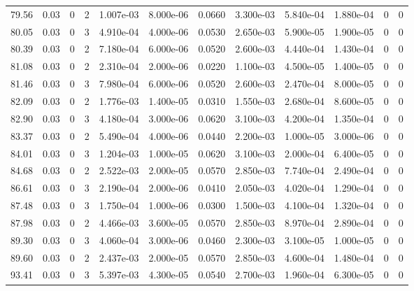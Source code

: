 \documentclass[preview]{standalone}
\begin{document}
{{{{\begin{tabular}{L{1.2cm}C{1.2cm} C{0.3cm}C{0.5cm} C{1.4cm}C{1.4cm} C{1.4cm}C{1.4cm} C{1.6cm}C{1.6cm} C{1.6cm}C{1.6cm}}
  79.56  &  0.03  & 0     &  2 &  1.007e-03  & 8.000e-06  &  0.0660&   3.300e-03& 5.840e-04 & 1.880e-04   &  0 & 0  \\ 
  80.05  &  0.03  & 0     &  3 &  4.910e-04  & 4.000e-06  &  0.0530&   2.650e-03& 5.900e-05 & 1.900e-05   &  0 & 0  \\ 
  80.39  &  0.03  & 0     &  2 &  7.180e-04  & 6.000e-06  &  0.0520&   2.600e-03& 4.440e-04 & 1.430e-04   &  0 & 0  \\ 
  81.08  &  0.03  & 0     &  2 &  2.310e-04  & 2.000e-06  &  0.0220&   1.100e-03& 4.500e-05 & 1.400e-05   &  0 & 0  \\ 
  81.46  &  0.03  & 0     &  3 &  7.980e-04  & 6.000e-06  &  0.0520&   2.600e-03& 2.470e-04 & 8.000e-05   &  0 & 0  \\ 
  82.09  &  0.03  & 0     &  2 &  1.776e-03  & 1.400e-05  &  0.0310&   1.550e-03& 2.680e-04 & 8.600e-05   &  0 & 0  \\ 
  82.90  &  0.03  & 0     &  3 &  4.180e-04  & 3.000e-06  &  0.0620&   3.100e-03& 4.200e-04 & 1.350e-04   &  0 & 0  \\ 
  83.37  &  0.03  & 0     &  2 &  5.490e-04  & 4.000e-06  &  0.0440&   2.200e-03& 1.000e-05 & 3.000e-06   &  0 & 0  \\ 
  84.01  &  0.03  & 0     &  3 &  1.204e-03  & 1.000e-05  &  0.0620&   3.100e-03& 2.000e-04 & 6.400e-05   &  0 & 0  \\ 
  84.68  &  0.03  & 0     &  2 &  2.522e-03  & 2.000e-05  &  0.0570&   2.850e-03& 7.740e-04 & 2.490e-04   &  0 & 0  \\ 
  86.61  &  0.03  & 0     &  3 &  2.190e-04  & 2.000e-06  &  0.0410&   2.050e-03& 4.020e-04 & 1.290e-04   &  0 & 0  \\ 
  87.48  &  0.03  & 0     &  3 &  1.750e-04  & 1.000e-06  &  0.0300&   1.500e-03& 4.100e-04 & 1.320e-04   &  0 & 0  \\ 
  87.98  &  0.03  & 0     &  2 &  4.466e-03  & 3.600e-05  &  0.0570&   2.850e-03& 8.970e-04 & 2.890e-04   &  0 & 0  \\ 
  89.30  &  0.03  & 0     &  3 &  4.060e-04  & 3.000e-06  &  0.0460&   2.300e-03& 3.100e-05 & 1.000e-05   &  0 & 0  \\ 
  89.60  &  0.03  & 0     &  2 &  2.437e-03  & 2.000e-05  &  0.0570&   2.850e-03& 4.600e-04 & 1.480e-04   &  0 & 0  \\ 
  93.41  &  0.03  & 0     &  3 &  5.397e-03  & 4.300e-05  &  0.0540&   2.700e-03& 1.960e-04 & 6.300e-05   &  0 & 0  \\ 
\hline 
\end{tabular} 

}}}}
\end{document}

